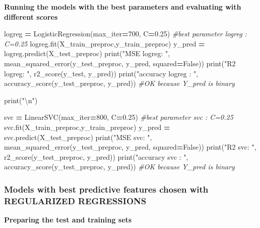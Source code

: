 \documentclass[10pt,a4paper]{article}
\newenvironment{Shaded}{\begin{snugshade}}{\end{snugshade}}
\newcommand{\BuiltInTok}[1]{#1}
\newcommand{\CharTok}[1]{\textcolor[rgb]{0.31,0.60,0.02}{#1}}
\newcommand{\CommentTok}[1]{\textcolor[rgb]{0.56,0.35,0.01}{\textit{#1}}}
\newcommand{\DecValTok}[1]{\textcolor[rgb]{0.00,0.00,0.81}{#1}}
\newcommand{\FloatTok}[1]{\textcolor[rgb]{0.00,0.00,0.81}{#1}}
\newcommand{\NormalTok}[1]{#1}
\newcommand{\OperatorTok}[1]{\textcolor[rgb]{0.81,0.36,0.00}{\textbf{#1}}}
\newcommand{\StringTok}[1]{\textcolor[rgb]{0.31,0.60,0.02}{#1}}
\newcommand{\VariableTok}[1]{\textcolor[rgb]{0.00,0.00,0.00}{#1}}
\theoremstyle{break}
\begin{document}
\textbf{Running the models with the best parameters and evaluating with different scores}

\begin{Shaded}
\begin{Highlighting}[]
\NormalTok{logreg }\OperatorTok{=}\NormalTok{ LogisticRegression(max_iter}\OperatorTok{=}\DecValTok{700}\NormalTok{, C}\OperatorTok{=}\FloatTok{0.25}\NormalTok{) }\CommentTok{#best parameter logreg : C=0.25}
\NormalTok{logreg.fit(X_train_preproc,y_train_preproc)}
\NormalTok{y_pred }\OperatorTok{=}\NormalTok{ logreg.predict(X_test_preproc)}
\BuiltInTok{print}\NormalTok{(}\StringTok{"MSE logreg: "}\NormalTok{, mean_squared_error(y_test_preproc, y_pred, squared}\OperatorTok{=}\VariableTok{False}\NormalTok{))}
\BuiltInTok{print}\NormalTok{(}\StringTok{"R2 logreg: "}\NormalTok{, r2_score(y_test, y_pred))}
\BuiltInTok{print}\NormalTok{(}\StringTok{"accuracy logreg : "}\NormalTok{, accuracy_score(y_test_preproc, y_pred)) }\CommentTok{#OK because Y_pred is binary}

\BuiltInTok{print}\NormalTok{(}\StringTok{"}\CharTok{\textbackslash{}n}\StringTok{"}\NormalTok{)}

\NormalTok{svc }\OperatorTok{=}\NormalTok{ LinearSVC(max_iter}\OperatorTok{=}\DecValTok{800}\NormalTok{, C}\OperatorTok{=}\FloatTok{0.25}\NormalTok{) }\CommentTok{#best parameter svc : C=0.25}
\NormalTok{svc.fit(X_train_preproc,y_train_preproc)}
\NormalTok{y_pred }\OperatorTok{=}\NormalTok{ svc.predict(X_test_preproc)}
\BuiltInTok{print}\NormalTok{(}\StringTok{"MSE svc: "}\NormalTok{, mean_squared_error(y_test_preproc, y_pred, squared}\OperatorTok{=}\VariableTok{False}\NormalTok{))}
\BuiltInTok{print}\NormalTok{(}\StringTok{"R2 svc: "}\NormalTok{, r2_score(y_test_preproc, y_pred))}
\BuiltInTok{print}\NormalTok{(}\StringTok{"accuracy svc : "}\NormalTok{, accuracy_score(y_test_preproc, y_pred)) }\CommentTok{#OK because Y_pred is binary}
\end{Highlighting}
\end{Shaded}

\hypertarget{models-with-best-predictive-features-chosen-with-regularized-regressions-1}{%
\subsubsection{Models with best predictive features chosen with REGULARIZED REGRESSIONS}\label{models-with-best-predictive-features-chosen-with-regularized-regressions-1}}

\textbf{Preparing the test and training sets}
\end{document}
